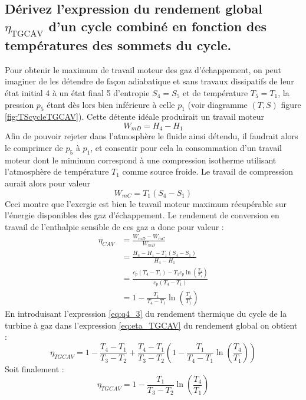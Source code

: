 \subsection{Dérivez l'expression du rendement global $\eta_\text{TGCAV}$ d'un cycle combiné en fonction des températures des sommets du cycle.}
Pour obtenir le maximum de travail moteur des gaz d'échappement, on peut imaginer de les détendre de façon adiabatique et sans travaux dissipatifs de leur état initial 4 à un état final 5 d'entropie $S_4 = S_5$ et de température $T_5=T_1$, la pression $p_5$ étant dès lors bien inférieure à celle $p_1$ (voir diagramme $(T,S)$ figure \ref{fig:TScycleTGCAV}). Cette détente idéale produirait un travail moteur
\begin{equation} W_{mD} = H_4-H_1 \end{equation}
Afin de pouvoir rejeter dans l'atmosphère le fluide ainsi détendu, il faudrait alors le comprimer de $p_5$ à $p_1$, et consentir pour cela la consommation d'un travail moteur dont le miminum correspond à une compression isotherme utilisant l'atmosphère de température $T_1$ comme source froide. Le travail de compression aurait alors pour valeur 
\begin{equation} W_{mC} = T_1(S_4-S_1) \end{equation}
Ceci montre que l'exergie est bien le travail moteur maximum récupérable sur l'énergie disponibles des gaz d'échappement. Le rendement de conversion en travail de l'enthalpie sensible de ces gaz a donc pour valeur :
\begin{align} \eta_{CAV} &= \frac{W_{mD}-W_{mC}}{W_{mD}} \\ &= \frac{H_4-H_1-T_1(S_4-S_1)}{H_4-H_1} \\ &= \frac{c_p(T_4-T_1) - T_1c_p\ln\left(\frac{T_4}{T_1}\right)}{c_p(T_4-T_1)} \\ &= 1 - \frac{T_1}{T_4-T_1}\ln\left(\frac{T_4}{T_1}\right) \end{align}
En introduisant l'expression \ref{eq:q4_3} du rendement thermique du cycle de la turbine à gaz dans l'expression \ref{eq:eta_TGCAV} du rendement global on obtient :
\begin{equation} \eta_{TGCAV} = 1 - \frac{T_4-T_1}{T_3-T_2} + \frac{T_4-T_1}{T_3-T_2}\left(1-\frac{T_1}{T_4-T_1}\ln\left(\frac{T_4}{T_1}\right)\right) \end{equation}
Soit finalement :
\begin{equation} \eta_{TGCAV} = 1-\frac{T_1}{T_3-T_2}\ln\left(\frac{T_4}{T_1}\right) \end{equation}
